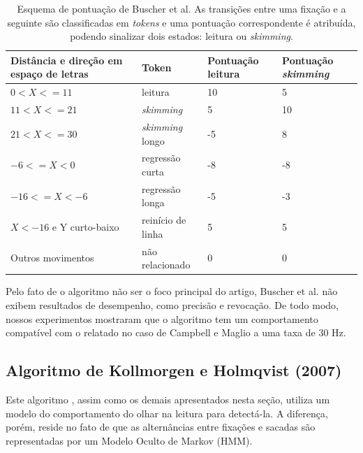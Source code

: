 \documentclass[12pt]{article}
\begin{document}
		\begin{table}[!h]
			\begin{center}
				\renewcommand{\arraystretch}{0.9}
				\begin{tabular}{|p{5cm}|l|p{2.5cm}|p{2.5cm}|}  \hline
					\textbf{Distância e direção em espaço de letras} & \textbf{Token} & \textbf{Pontuação leitura} & \textbf{Pontuação \textit{skimming}}\\\hline
					$0 < X <= 11$   & leitura   & 10       & 5\\
					$ 11 < X <= 21$ & \textit{skimming}  & 5        & 10\\
					$21 < X <= 30$  & \textit{skimming} longo  & -5  & 8\\
					$-6 <= X < 0$   & regressão curta & -8 & -8\\
					$-16 <= X < -6$ & regressão longa & -5 & -3\\
					$X < -16$ e Y curto-baixo& reinício de linha & 5& 5\\
					Outros movimentos  & não relacionado  & 0 & 0\\\hline
					
				\end{tabular}
			\end{center}
			\label{tab:buscher_tab}
			\caption{\footnotesize{Esquema de pontuação de Buscher et al. As transições entre uma fixação e a seguinte são classificadas em \textit{tokens} e uma pontuação correspondente é atribuída, podendo sinalizar dois estados: leitura ou \textit{skimming}.}}
		\end{table}
		
		Pelo fato de o algoritmo não ser o foco principal do artigo, Buscher et al. não exibem resultados de desempenho, como precisão e revocação. De todo modo, nossos experimentos mostraram que o algoritmo tem um comportamento compatível com o relatado no caso de Campbell e Maglio \cite{Campbell-2001} a uma taxa de 30 Hz.
		
				
		\subsection{Algoritmo de Kollmorgen e Holmqvist (2007)}
		Este algoritmo \cite{Kollmorgen-2007}, assim como os demais apresentados nesta seção, utiliza um modelo do comportamento do olhar na leitura para detectá-la. A diferença, porém, reside no fato de que as alternâncias entre fixações e sacadas são representadas por um Modelo Oculto de Markov (HMM).
		
\end{document}
